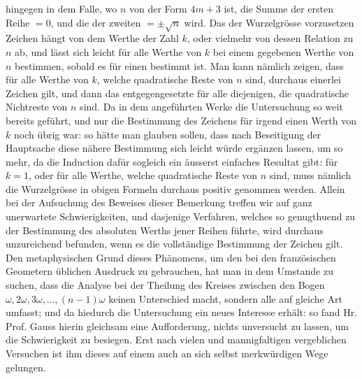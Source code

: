 \documentclass[12pt]{article}
\begin{document}
hingegen in dem Falle, wo $n$ von der Form $4m+3$ ist, die Summe der ersten Reihe $=0$, und die der zweiten $=\pm\sqrt n$ wird. Das der Wurzelgrösse vorzusetzen Zeichen hängt von dem Werthe der Zahl $k$, oder vielmehr von dessen Relation zu $n$ ab, und lässt sich leicht für alle Werthe von $k$ bei einem gegebenen Werthe von $n$ bestimmen, sobald es für einen bestimmt ist. Man kann nämlich zeigen, dass für alle Werthe von $k$, welche quadratische Reste von $n$ sind, durchaus einerlei Zeichen gilt, und dann das entgegengesetzte für alle diejenigen, die quadratische Nichtreste von $n$ sind. Da in dem angeführten Werke die Untersuchung so weit bereits geführt, und nur die Bestimmung des Zeichens für irgend einen Werth von $k$ noch übrig war: so hätte man glauben sollen, dass nach Beseitigung der Hauptsache diese nähere Bestimmung sich leicht würde ergänzen lassen, um so mehr, da die Induction dafür sogleich ein äusserst einfaches Resultat gibt: für $k=1$, oder für alle Werthe, welche quadratische Reste von $n$ sind, muss nämlich die Wurzelgrösse in obigen Formeln durchaus positiv genommen werden. Allein bei der Aufsuchung des Beweises dieser Bemerkung treffen wir auf ganz unerwartete Schwierigkeiten, und dasjenige Verfahren, welches so genugthuend zu der Bestimmung des absoluten Werths jener Reihen führte, wird durchaus unzureichend befunden, wenn es die vollständige Bestimmung der Zeichen gilt. Den metaphysischen Grund dieses Phänomens, um den bei den französischen Geometern üblichen Ausdruck zu gebrauchen, hat man in dem Umstande zu suchen, dass die Analyse bei der Theilung des Kreises zwischen den Bogen $\omega,2\omega,3\omega,\ldots,(n-1)\omega$ keinen Unterschied macht, sondern alle auf gleiche Art umfasst; und da hiedurch die Untersuchung ein neues Interesse erhält: so fand Hr. Prof. Gauss hierin gleichsam eine Aufforderung, nichts unversucht zu lassen, um die Schwierigkeit zu besiegen. Erst nach vielen und mannigfaltigen vergeblichen Versuchen ist ihm dieses auf einem auch an sich selbst merkwürdigen Wege gelungen.
\end{document}
